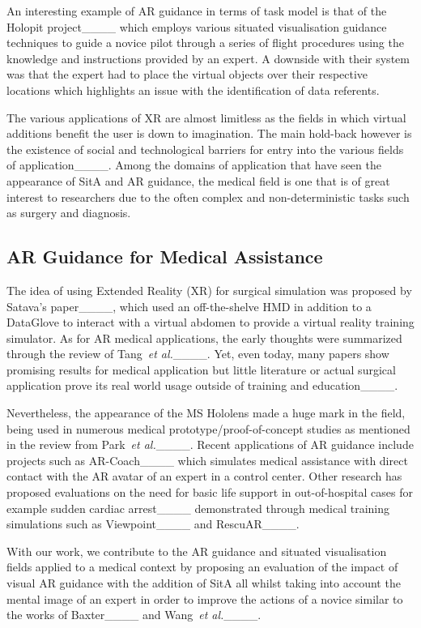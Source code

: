 An interesting example of AR guidance in terms of task model is that of the Holopit project____ which employs various situated visualisation guidance techniques to guide a novice pilot through a series of flight procedures using the knowledge and instructions provided by an expert.
A downside with their system was that the expert had to place the virtual objects over their respective locations which highlights an issue with the identification of data referents.

The various applications of XR are almost limitless as the fields in which virtual additions benefit the user is down to imagination. 
The main hold-back however is the existence of social and technological barriers for entry into the various fields of application____.
Among the domains of application that have seen the appearance of SitA and AR guidance, the medical field is one that is of great interest to researchers due to the often complex and non-deterministic tasks such as surgery and diagnosis.

\subsection{AR Guidance for Medical Assistance}
\label{medical_ar}

The idea of using Extended Reality (XR) for surgical simulation was proposed by Satava's paper____, which used an off-the-shelve HMD in addition to a DataGlove to interact with a virtual abdomen to provide a virtual reality training simulator.
As for AR medical applications, the early thoughts were summarized through the review of Tang~\textit{et al.}____.
Yet, even today, many papers show promising results for medical application but little literature or actual surgical application prove its real world usage outside of training and education____.

Nevertheless, the appearance of the MS Hololens made a huge mark in the field, being used in numerous medical prototype/proof-of-concept studies as mentioned in the review from Park~\textit{et al.}____.
Recent applications of AR guidance include projects such as AR-Coach____ which simulates medical assistance with direct contact with the AR avatar of an expert in a control center.
Other research has proposed evaluations on the need for basic life support in out-of-hospital cases for example sudden cardiac arrest____ demonstrated through medical training simulations such as Viewpoint____ and RescuAR____.

With our work, we contribute to the AR guidance and situated visualisation fields applied to a medical context by proposing an evaluation of the impact of visual AR guidance with the addition of SitA all whilst taking into account the mental image of an expert in order to improve the actions of a novice similar to the works of Baxter____ and Wang~\textit{et al.}____.